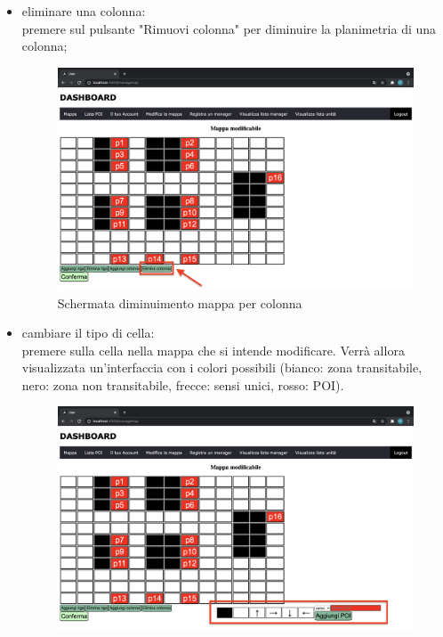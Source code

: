 \begin{itemize}
\begin{itemize}
\begin{figure}[H]
            \end{figure}
            \item eliminare una colonna: \\premere sul pulsante "Rimuovi colonna" per diminuire la planimetria di una colonna;
            \begin{figure}[H]
                \centering
                \includegraphics[scale=0.12]{res/images/modificamappa4.png}
                \caption{Schermata diminuimento mappa per colonna}
            \end{figure}
            \item cambiare il tipo di cella: \\premere sulla cella nella mappa che si intende modificare. Verrà allora visualizzata un'interfaccia con i colori possibili (bianco: zona transitabile, nero: zona non transitabile, frecce: sensi unici, rosso: POI). 
            \begin{figure}[H]
                \centering
                \includegraphics[scale=0.12]{res/images/modificamappa5.png}

\end{figure}
\end{itemize}
\end{itemize}
